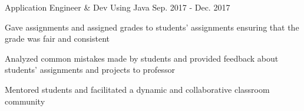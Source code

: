 \begin{cventries}
  \vspace{-11mm}
  \cventry
    {Application Engineer \& Dev Using Java}
    {}
    {}
    {Sep. 2017 - Dec. 2017}
    {
      \begin{cvitems} %
        \item {Gave assignments and assigned grades to students’ assignments ensuring that the grade was fair and consistent}
        \item {Analyzed common mistakes made by students and provided feedback about students' assignments and projects to professor}
        \item {Mentored students and facilitated a dynamic and collaborative classroom community}
      \end{cvitems}
    }
  \vspace{-3mm}

\end{cventries}
